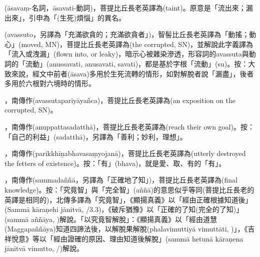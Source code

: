 \startitemgroup[noteitems]
\item{}(āsavaṃ-名詞，āsavati-動詞)，菩提比丘長老英譯為(taint)。原意是「流出來；漏出來」，引申為「(生死)煩惱」的異名。
\item{}(avassuto，另譯為「充滿欲貪的；充滿欲貪者」)，智髻比丘長老英譯為「動搖；動心」(moved, MN)，菩提比丘長老英譯為(the corrupted, SN)，並解說此字義譯為「流入或洩漏」(flown into, or leaky)，暗示心被雜染滲透，形容詞的avassuta與動詞的「流動」(anussavati, anusavati, savati)，都是基於字根「流動」(su)。按：大致來說，經文中前者(āsava)多用於生死流轉的情形，如對解脫者說「漏盡」，後者多用於六根對六境時的情形。
\item{}，南傳作(avassutapariyāyañca)，菩提比丘長老英譯為(an exposition on the corrupted, SN)。
\stopitemgroup

\startitemgroup[noteitems]
\item{}，南傳作(anuppattasadatthā)，菩提比丘長老英譯為(reach their own goal)。按：「自己的利益」(sadatthā)，另譯為「善利；妙利，理想」。
\stopitemgroup

\startitemgroup[noteitems]
\item{}，南傳作(parikkhīṇabhavasaṃyojanā)，菩提比丘長老英譯為(utterly destroyed the fetters of existence)。按：「有」(bhava)，就是愛、取、有的「有」。
\stopitemgroup

\startitemgroup[noteitems]
\item{}，南傳作(sammadaññā，另譯為「正確地了知」)，菩提比丘長老英譯為(final knowledge)。按：「究竟智」與「完全智」(aññā)的意思似乎等同(菩提比丘長老的英譯是相同的)，北傳多譯為「究竟智」，《顯揚真義》以「經由正確根據知道後」(Sammā kāraṇehi jānitvā, /3.3)，《破斥猶豫》以「正確的了知(完全的了知)」(sammā aññāya, )解說。「以究竟智解脫」：《顯揚真義》以「經由道慧(Maggapaññāya)知道四諦法後，以解脫果解脫(phalavimuttiyā vimuttāti, )」，《吉祥悅意》等以「經由證確的原因、理由知道後解脫」(sammā hetunā kāraṇena jānitvā vimutto, /)解說。
\stopitemgroup

